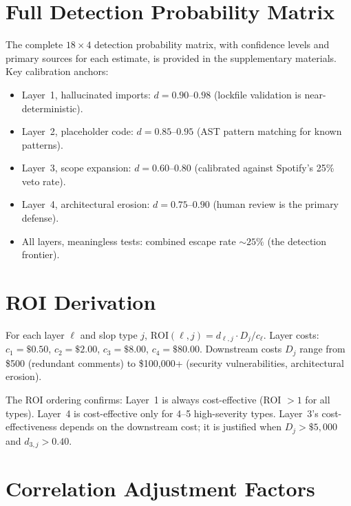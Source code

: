 \documentclass[11pt, a4paper, copyright]{googledeepmind}
\newcommand{\ROI}{\mathrm{ROI}}
\begin{document}
\begin{appendices}

\section{Full Detection Probability Matrix}
\label{app:matrix}

The complete $18 \times 4$ detection probability matrix, with confidence levels and primary sources for each estimate, is provided in the supplementary materials. Key calibration anchors:

\begin{itemize}
\item Layer~1, hallucinated imports: $d = 0.90$--$0.98$ (lockfile validation is near-deterministic).
\item Layer~2, placeholder code: $d = 0.85$--$0.95$ (AST pattern matching for known patterns).
\item Layer~3, scope expansion: $d = 0.60$--$0.80$ (calibrated against Spotify's 25\% veto rate).
\item Layer~4, architectural erosion: $d = 0.75$--$0.90$ (human review is the primary defense).
\item All layers, meaningless tests: combined escape rate ${\sim}25\%$ (the detection frontier).
\end{itemize}

\section{ROI Derivation}
\label{app:roi}

For each layer $\ell$ and slop type $j$, $\ROI(\ell, j) = d_{\ell,j} \cdot D_j / c_\ell$. Layer costs: $c_1 = \$0.50$, $c_2 = \$2.00$, $c_3 = \$8.00$, $c_4 = \$80.00$. Downstream costs $D_j$ range from \$500 (redundant comments) to \$100,000+ (security vulnerabilities, architectural erosion).

The ROI ordering confirms: Layer~1 is always cost-effective (ROI $> 1$ for all types). Layer~4 is cost-effective only for 4--5 high-severity types. Layer~3's cost-effectiveness depends on the downstream cost; it is justified when $D_j > \$5{,}000$ and $d_{3,j} > 0.40$.

\section{Correlation Adjustment Factors}
\label{app:correlation}


\end{appendices}
\end{document}
